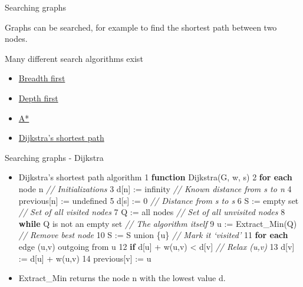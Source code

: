 \documentclass[compress]{beamer}
\begin{document}
\begin{frame}{Searching graphs}

Graphs can be searched, for example to find the shortest path between
two nodes.

Many different search algorithms exist

\begin{itemize}
\item \href{http://en.wikipedia.org/wiki/Breadth-first_search}{Breadth
  first}
\item \href{http://en.wikipedia.org/wiki/Depth-first_search}{Depth first}
\item \href{http://en.wikipedia.org/wiki/A*_search_algorithm}{A*}
\item \href{http://en.wikipedia.org/wiki/Dijkstra's_algorithm}{Dijkstra's
  shortest path}
\end{itemize}

\end{frame}

\begin{frame}{Searching graphs - Dijkstra}

\begin{itemize}
\item Dijkstra's shortest path algorithm 1 \textbf{function} Dijkstra(G, w,
  s) 2 \textbf{for each} node n \emph{// Initializations} 3 d{[}n{]} :=
  infinity \emph{// Known distance from s to n} 4 previous{[}n{]} :=
  undefined 5 d{[}s{]} := 0 \emph{// Distance from s to s} 6 S := empty
  set \emph{// Set of all visited nodes} 7 Q := all nodes \emph{// Set
  of all unvisited nodes} 8 \textbf{while} Q is not an empty set
  \emph{// The algorithm itself} 9 u := Extract\_Min(Q) \emph{// Remove
  best node} 10 S := S union \{u\} \emph{// Mark it `visited'} 11
  \textbf{for each} edge (u,v) outgoing from u 12 \textbf{if} d{[}u{]} +
  w(u,v) \textless{} d{[}v{]} \emph{// Relax (u,v)} 13 d{[}v{]} :=
  d{[}u{]} + w(u,v) 14 previous{[}v{]} := u
\item Extract\_Min returns the node n with the lowest value d.
\end{itemize}

\end{frame}
\end{document}
